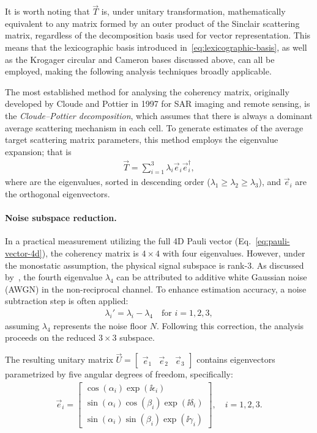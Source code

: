 It is worth noting that $\vec T$ is, under unitary transformation, mathematically equivalent to any matrix formed by an outer product of the Sinclair scattering matrix, regardless of the decomposition basis used for vector representation.
This means that the lexicographic basis introduced in~\cref{eq:lexicographic-basis}, as well as the Krogager circular and Cameron bases discussed above, can all be employed, making the following analysis techniques broadly applicable.

The most established method for analysing the coherency matrix, originally developed by Cloude and Pottier in 1997 for SAR imaging and remote sensing, is the \emph{Cloude--Pottier decomposition}, which assumes that there is always a dominant average scattering mechanism in each cell.
To generate estimates of the average target scattering matrix parameters, this method employs the eigenvalue expansion; that is
\begin{align}
    \vec T = \sum_{i=1}^3 \lambda_i \vec e_i \vec e_i^\dagger,
\end{align}
where are the eigenvalues, sorted in descending order ($\lambda_1 \ge \lambda_2 \ge \lambda_3$), and $\vec e_i$ are the orthogonal eigenvectors.

\paragraph{Noise subspace reduction.}
In a practical measurement utilizing the full 4D Pauli vector (Eq.~\ref{eq:pauli-vector-4d}), the coherency matrix is $4 \times 4$ with four eigenvalues.
However, under the monostatic assumption, the physical signal subspace is rank-3.
As discussed by~\textcite{visentinPolarimetricRadarAutomotive2019}, the fourth eigenvalue $\lambda_4$ can be attributed to additive white Gaussian noise (AWGN) in the non-reciprocal channel.
To enhance estimation accuracy, a noise subtraction step is often applied:
\begin{align}
    \lambda_i' = \lambda_i - \lambda_4 \quad \text{for } i=1,2,3,
\end{align}
assuming $\lambda_4$ represents the noise floor $N$.
Following this correction, the analysis proceeds on the reduced $3 \times 3$ subspace.

The resulting unitary matrix $\vec U = \begin{bmatrix} \vec e_1 & \vec e_2 & \vec e_3 \end{bmatrix}$ contains eigenvectors parametrized by five angular degrees of freedom, specifically:
\begin{align}
    \label{eq:eigenvector-parametrization}
    \vec e_i = \begin{bmatrix}
        \cos(\alpha_i)\exp(\ii\epsilon_i) \\
        \sin(\alpha_i) \cos(\beta_i) \exp(\ii \delta_i) \\
        \sin(\alpha_i) \sin(\beta_i) \exp(\ii \gamma_i)
    \end{bmatrix}, \quad i=1,2,3.
\end{align}

